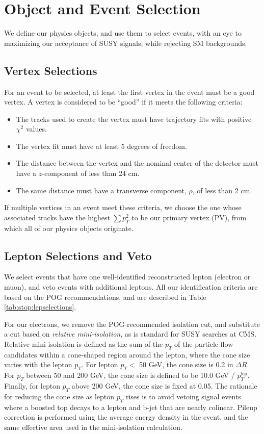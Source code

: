 \section{Object and Event Selection}
\label{sec:stop:selections}

We define our physics objects, and use them to select events, with an
eye to maximizing our acceptance of SUSY signals, while rejecting SM backgrounds.

\subsection{Vertex Selections}
\label{ssec:stop:vtxselections}

For an event to be selected, at least the first vertex in the event
must be a good vertex. A vertex is considered to be ``good'' if it
meets the following criteria:

\begin{itemize}
\item The tracks used to create the vertex must have trajectory fits
  with positive $\chi^2$ values.
\item The vertex fit must have at least 5 degrees of freedom.
\item The distance between the vertex and the nominal center of the
  detector must have a $z$-component of less than 24 cm.
\item The same distance must have a transverse component, $\rho$, of
  less than 2 cm.
\end{itemize}

If multiple vertices in an event meet these criteria, we choose the
one whose associated tracks have the highest $\sum p_T^2$ to be our
primary vertex (PV), from which all of our physics objects originate.

\subsection{Lepton Selections and Veto}
\label{ssec:stop:lepselections}

We select events that have one well-identified reconstructed lepton
(electron or muon), and veto events with additional leptons. All our
identification criteria are based on the POG recommendations, and are
described in Table \ref{tab:stop:lepselections}.

For our electrons, we remove the POG-recommended isolation cut, and
substitute a cut based on \emph{relative mini-isolation}, as is standard for
SUSY searches at CMS. Relative mini-isolation is defined as the sum of
the $p_T$ of the particle flow candidates within a cone-shaped region
around the lepton, where the cone size varies with the lepton
$p_T$. For lepton $p_T <$ 50 GeV, the cone size is 0.2 in $\Delta
R$. For $p_T$ between 50 and 200 GeV, the cone size is defined to be
10.0 GeV / $p_T^{\text{lep}}$. Finally, for lepton $p_T$ above 200 GeV, the
cone size is fixed at 0.05. The rationale for reducing the cone size
as lepton $p_T$ rises is to avoid vetoing signal events
where a boosted top decays to a lepton and b-jet that are nearly
colinear. Pileup correction is performed using the average energy
density in the event, and the same effective area used in the
mini-isolation calculation.


